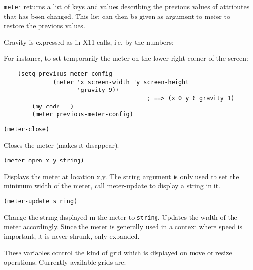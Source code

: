 \verb"meter" returns a list of keys and values describing the previous values
of attributes that has been changed. This list can then be given as
argument to meter to restore the previous values.

Gravity is expressed as in X11 calls, i.e. by the numbers:
\centerline{}
For instance, to set temporarily the meter on the lower right corner
of the screen:

{\exemplefont\begin{verbatim}
	(setq previous-meter-config
              (meter 'x screen-width 'y screen-height
                     'gravity 9))
                                         ; ==> (x 0 y 0 gravity 1)
        (my-code...)
        (meter previous-meter-config)
\end{verbatim}}

        
{\usagefont\begin{verbatim}
(meter-close)
\end{verbatim}}\usageupspace

Closes the meter (makes it disappear).

        
{\usagefont\begin{verbatim}
(meter-open x y string)
\end{verbatim}}\usageupspace

Displays the meter at location x,y. The string argument is only used to set
the minimum width of the meter, call meter-update to display a string in it.

        
{\usagefont\begin{verbatim}
(meter-update string)
\end{verbatim}}\usageupspace

Change the string displayed in the meter to \verb"string". Updates the width
of the meter accordingly. Since the meter is generally used in a context
where speed is important, it is never shrunk, only expanded.

        

These variables control the kind of grid which is displayed on move or
resize operations. Currently available grids are:

